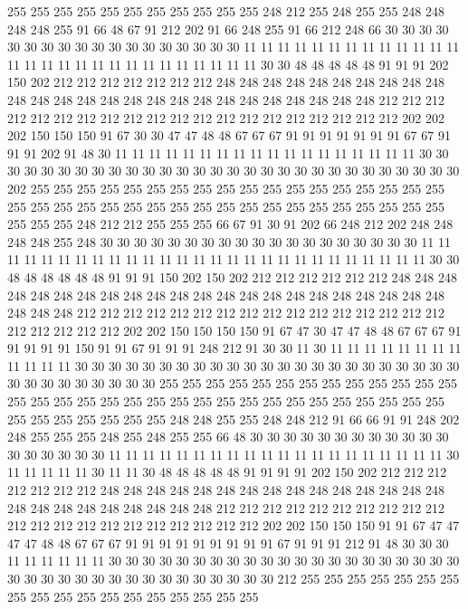 255 255 255 255 255 255 255 255 255 255 255 248 212 255 248 255 255 248 248 248
248 255 91 66 48 67 91 212 202 91 66 248 255 91 66 212 248 66 30 30
30 30 30 30 30 30 30 30 30 30 30 30 30 30 30 30 11 11 11 11
11 11 11 11 11 11 11 11 11 11 11 11 11 11 11 11 11 11 11 11
11 11 11 11 30 30 48 48 48 48 48 91 91 91 202 150 202 212 212 212
212 212 212 212 248 248 248 248 248 248 248 248 248 248 248 248 248 248 248 248
248 248 248 248 248 248 248 248 248 248 212 212 212 212 212 212 212 212 212 212
212 212 212 212 212 212 212 212 212 212 202 202 202 150 150 150 91 67 30 30
47 47 48 48 67 67 67 91 91 91 91 91 91 91 67 67 91 91 91 202
91 48 30 11 11 11 11 11 11 11 11 11 11 11 11 11 11 11 11 11
11 30 30 30 30 30 30 30 30 30 30 30 30 30 30 30 30 30 30 30
30 30 30 30 30 30 30 30 30 30 202 255 255 255 255 255 255 255 255 255
255 255 255 255 255 255 255 255 255 255 255 255 255 255 255 255 255 255 255 255
255 255 255 255 255 255 255 255 255 255 255 248 212 212 255 255 255 66 67 91
30 91 202 66 248 212 202 248 248 248 248 255 248 30 30 30 30 30 30 30
30 30 30 30 30 30 30 30 30 30 30 30 11 11 11 11 11 11 11 11
11 11 11 11 11 11 11 11 11 11 11 11 11 11 11 11 11 11 11 30
30 48 48 48 48 48 48 91 91 91 150 202 150 202 212 212 212 212 212 212
248 248 248 248 248 248 248 248 248 248 248 248 248 248 248 248 248 248 248 248
248 248 248 248 248 212 212 212 212 212 212 212 212 212 212 212 212 212 212 212
212 212 212 212 212 212 202 202 150 150 150 150 91 67 47 30 47 47 48 48
67 67 67 91 91 91 91 91 150 91 91 67 91 91 91 248 212 91 30 30
11 30 11 11 11 11 11 11 11 11 11 11 11 11 30 30 30 30 30 30
30 30 30 30 30 30 30 30 30 30 30 30 30 30 30 30 30 30 30 30
30 30 30 30 30 30 255 255 255 255 255 255 255 255 255 255 255 255 255 255
255 255 255 255 255 255 255 255 255 255 255 255 255 255 255 255 255 255 255 255
255 255 255 255 255 248 248 255 255 248 248 212 91 66 66 91 91 248 202 248
255 255 255 248 255 248 255 255 66 48 30 30 30 30 30 30 30 30 30 30
30 30 30 30 30 30 30 30 11 11 11 11 11 11 11 11 11 11 11 11
11 11 11 11 11 11 11 11 30 11 11 11 11 11 30 11 11 30 48 48
48 48 48 91 91 91 91 202 150 202 212 212 212 212 212 212 212 248 248 248
248 248 248 248 248 248 248 248 248 248 248 248 248 248 248 248 248 248 248 248
248 212 212 212 212 212 212 212 212 212 212 212 212 212 212 212 212 212 212 212
212 212 202 202 150 150 150 91 91 67 47 47 47 47 48 48 67 67 67 91
91 91 91 91 91 91 91 91 67 91 91 91 212 91 48 30 30 30 11 11
11 11 11 11 30 30 30 30 30 30 30 30 30 30 30 30 30 30 30 30
30 30 30 30 30 30 30 30 30 30 30 30 30 30 30 30 30 30 30 30
30 212 255 255 255 255 255 255 255 255 255 255 255 255 255 255 255 255 255 255
